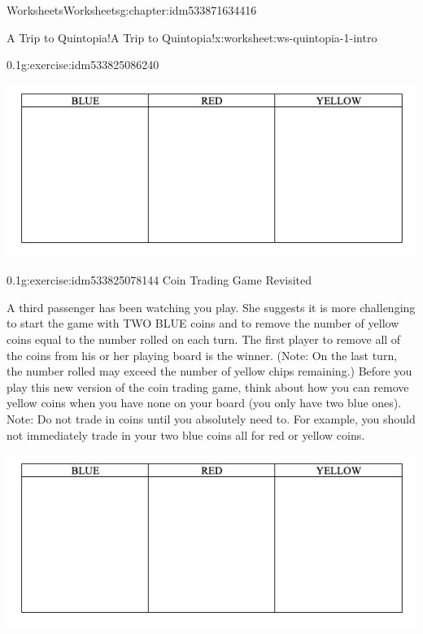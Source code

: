 \documentclass[twoside,11pt,]{book}
\begin{document}
\begin{chapterptx}{Worksheets}{}{Worksheets}{}{}{g:chapter:idm533871634416}
\begin{worksheet-section-numberless}{A Trip to Quintopia!}{}{A Trip to Quintopia!}{}{}{x:worksheet:ws-quintopia-1-intro}
\begin{divisionexercise}{1}{}{0.1}{g:exercise:idm533825086240}
\begin{sidebyside}{1}{0}{0}{0}
\begin{sbspanel}{1}
\includegraphics[width=1\linewidth]{images/quintopia-table.png}
\end{sbspanel}%
\end{sidebyside}%
\end{divisionexercise}%
\clearpage
\begin{divisionexercise}{2}{}{0.1}{g:exercise:idm533825078144}%
Coin Trading Game Revisited%
\par
A third passenger has been watching you play.  She suggests it is more challenging to start the game with TWO BLUE coins and to remove the number of yellow coins equal to the number rolled on each turn.  The first player to remove all of the coins from his or her playing board is the winner.  (Note: On the last turn, the number rolled may exceed the number of yellow chips remaining.)  Before you play this new version of the coin trading game, think about how you can remove yellow coins when you have none on your board (you only have two blue ones).  Note: Do not trade in coins until you absolutely need to.  For example, you should not immediately trade in your two blue coins all for red or yellow coins.%
\begin{sidebyside}{1}{0}{0}{0}%
\begin{sbspanel}{1}%
\includegraphics[width=1\linewidth]{images/quintopia-table.png}
\end{sbspanel}%
\end{sidebyside}%
%
\begin{description}

\end{description}
\end{divisionexercise}
\end{worksheet-section-numberless}
\end{chapterptx}
\end{document}
